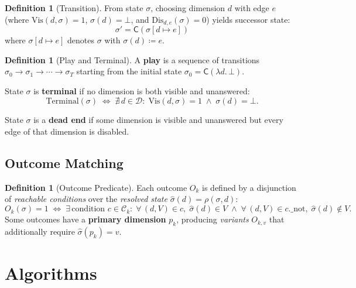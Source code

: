 \documentclass[11pt]{article}
\theoremstyle{definition}
\newtheorem{definition}[theorem]{Definition}
\newcommand{\Dim}{\mathcal{D}}         %
\newcommand{\sel}{\sigma}              %
\newcommand{\clean}{\mathsf{C}}        %
\newcommand{\res}[2]{\rho(#1,#2)}      %
\newcommand{\Vis}{\mathrm{Vis}}        %
\newcommand{\Dis}{\mathrm{Dis}}        %
\begin{document}
\begin{definition}[Transition]\label{def:trans}
From state $\sel$, choosing dimension $d$ with edge $e$ (where
$\Vis(d,\sel)=1$, $\sel(d)=\bot$, and $\Dis_{d,e}(\sel)=0$) yields
successor state:
\[
  \sel' = \clean(\sel[d \mapsto e])
\]
where $\sel[d \mapsto e]$ denotes $\sel$ with $\sel(d) \coloneqq e$.
\end{definition}

\begin{definition}[Play and Terminal]\label{def:play}
A \textbf{play} is a sequence of transitions
$\sel_0 \to \sel_1 \to \cdots \to \sel_T$ starting from the initial state
$\sel_0 = \clean(\lambda d.\,\bot)$.

State $\sel$ is \textbf{terminal} if no dimension is both visible and
unanswered:
\[
  \mathrm{Terminal}(\sel) \;\iff\;
  \nexists\, d \in \Dim :\;
  \Vis(d,\sel) = 1 \;\wedge\; \sel(d) = \bot.
\]

State $\sel$ is a \textbf{dead end} if some dimension is visible and
unanswered but every edge of that dimension is disabled.
\end{definition}

\subsection{Outcome Matching}\label{sec:outcomes}

\begin{definition}[Outcome Predicate]\label{def:outcome}
Each outcome $O_k$ is defined by a disjunction of \emph{reachable
conditions} over the \emph{resolved state}
$\hat\sel(d) = \res{\sel}{d}$:
\[
  O_k(\sel) = 1 \;\iff\;
  \exists\, \text{condition } c \in \mathcal{C}_k :\;
    \forall\,(d,V) \in c,\; \hat\sel(d) \in V
    \;\wedge\;
    \forall\,(d,V) \in c.\text{\_not},\; \hat\sel(d) \notin V.
\]
Some outcomes have a \textbf{primary dimension} $p_k$, producing
\emph{variants} $O_{k,v}$ that additionally require
$\hat\sel(p_k) = v$.
\end{definition}


\section{Algorithms}\label{sec:algorithms}
\end{document}

